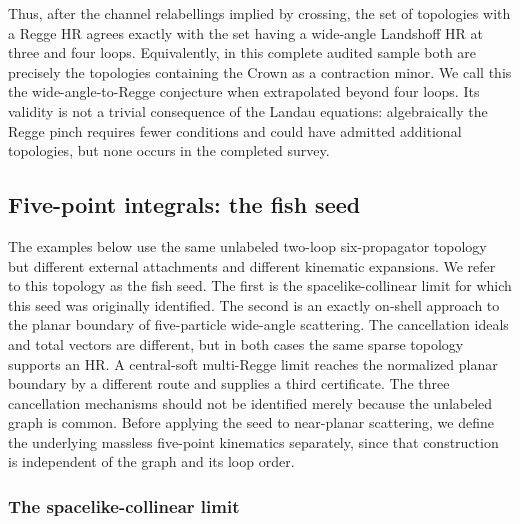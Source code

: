 \documentclass[a4paper,11pt]{article}
\begin{document}
Thus, after the channel relabellings implied by crossing, the set of
topologies with a Regge HR agrees exactly with the set having a wide-angle
Landshoff HR at three and four loops.  Equivalently, in this complete audited
sample both are precisely the topologies containing the Crown as a
contraction minor.  We call this the wide-angle-to-Regge conjecture when
extrapolated beyond four loops.  Its validity is not a trivial consequence
of the Landau equations: algebraically the Regge pinch requires fewer
conditions and could have admitted additional topologies, but none occurs in
the completed survey.

\subsection{Five-point integrals: the fish seed}
\label{sec:example-five-point}

The examples below use the same unlabeled two-loop six-propagator
topology but different external attachments and different kinematic
expansions.  We refer to this topology as the fish seed.  The first is the
spacelike-collinear limit for which this seed
was originally identified.  The second is an exactly on-shell approach to
the planar boundary of five-particle wide-angle scattering.  The
cancellation ideals and total vectors are different, but in both cases the
same sparse topology supports an HR.  A central-soft multi-Regge limit
reaches the normalized planar boundary by a different route and supplies a
third certificate.  The three cancellation mechanisms should not be
identified merely because the unlabeled graph is common.  Before applying
the seed to near-planar scattering, we define the underlying massless
five-point kinematics separately, since that construction is independent of
the graph and its loop order.

\subsubsection{The spacelike-collinear limit}
\label{sec:five-point-spacelike-collinear}
\end{document}

